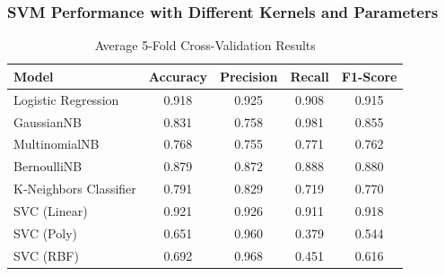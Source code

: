 \documentclass[12pt]{article}
\begin{document}
\subsubsection*{SVM Performance with Different Kernels and Parameters}
\begin{table}[H]
\centering
\caption{SVM Performance with Different Kernels and Parameters}
\label{tab:svm_kernels}
\end{table}
\begin{table}[H]
\centering
\caption{Average 5-Fold Cross-Validation Results}
\label{tab:cv_comparison}
\small
\begin{tabular}{@{}lcccc@{}}
\toprule
\textbf{Model} & \textbf{Accuracy} & \textbf{Precision} & \textbf{Recall} & \textbf{F1-Score} \\
\midrule
Logistic Regression & 0.918 & 0.925 & 0.908 & 0.915 \\
GaussianNB & 0.831 & 0.758 & 0.981 & 0.855 \\
MultinomialNB & 0.768 & 0.755 & 0.771 & 0.762 \\
BernoulliNB & 0.879 & 0.872 & 0.888 & 0.880 \\
K-Neighbors Classifier & 0.791 & 0.829 & 0.719 & 0.770 \\
SVC (Linear) & 0.921 & 0.926 & 0.911 & 0.918 \\
SVC (Poly) & 0.651 & 0.960 & 0.379 & 0.544 \\
SVC (RBF) & 0.692 & 0.968 & 0.451 & 0.616 \\

\bottomrule
\end{tabular}
\end{table}
\end{document}
